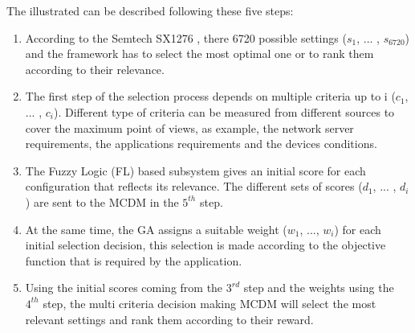 The  illustrated  can be described following these five steps:


\begin{enumerate}
\item According to the Semtech SX1276  \cite{lorasemtech},
	there  6720 possible settings ($s_{1}$, ... , $s_{6720}$) and the framework has to select the most optimal one or to rank them according to their relevance.
\item The first step of the selection process depends on multiple criteria up to i ($c_{1}$, ... , $c_{i}$).
	Different type of criteria can be measured from different sources to cover the maximum point of views,
	as  example,
	the network server requirements,
	the applications requirements and the devices conditions.
\item The Fuzzy Logic (FL) based subsystem gives an initial score for each configuration that reflects its relevance.
The different sets of scores ($d_{1}$, ... , $d_{i}$) are sent to the \ac{MCDM} in the $5^{th}$ step.
\item At the same time,
	the \ac{GA} \cite{alkhawlani_access_2008} assigns a suitable weight ($w_{1}$, ..., $w_{i}$) for each initial selection decision,
	this selection is made according to the objective function that is required by the application.
\item Using the initial scores coming from the $3^{rd}$ step and the weights using the $4^{th}$ step,
	the multi criteria decision making{} \ac{MCDM} will select the most relevant settings and rank them according to their reward.
\end{enumerate}

